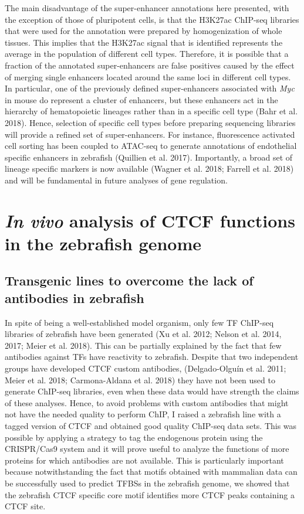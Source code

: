 The main disadvantage of the super-enhancer annotations here presented, with the exception of those of pluripotent cells, is that the H3K27ac ChIP-seq libraries that were used for the annotation were prepared by homogenization of whole tissues. This implies that the H3K27ac signal that is identified represents the average in the population of different cell types. Therefore, it is possible that a fraction of the annotated super-enhancers are false positives caused by the effect of merging single enhancers located around the same loci in different cell types. In particular, one of the previously defined super-enhancers associated with \textit{Myc} in mouse do represent a cluster of enhancers, but these enhancers act in the hierarchy of hematopoietic lineages rather than in a specific cell type (Bahr et al. 2018). Hence, selection of specific cell types before preparing sequencing libraries will provide a refined set of super-enhancers. For instance, fluorescence activated cell sorting has been coupled to ATAC-seq to generate annotations of endothelial specific enhancers in zebrafish (Quillien et al. 2017). Importantly, a broad set of lineage specific markers is now available (Wagner et al. 2018; Farrell et al. 2018) and will be fundamental in future analyses of gene regulation.\\

	\section{\textit{In vivo} analysis of CTCF functions in the zebrafish genome}

		\subsection{Transgenic lines to overcome the lack of antibodies in zebrafish}

In spite of being a well-established model organism, only few TF ChIP-seq libraries of zebrafish have been generated (Xu et al. 2012; Nelson et al. 2014, 2017; Meier et al. 2018). This can be partially explained by the fact that few antibodies against TFs have reactivity to zebrafish. Despite that two independent groups have developed CTCF custom antibodies, (Delgado-Olguín et al. 2011; Meier et al. 2018; Carmona-Aldana et al. 2018) they have not been used to generate ChIP-seq libraries, even when these data would have strength the claims of these analyses. Hence, to avoid problems with custom antibodies that might not have the needed quality to perform ChIP, I raised a zebrafish line with a tagged version of CTCF and obtained good quality ChIP-seq data sets. This was possible by applying a strategy to tag the endogenous protein using the CRISPR/Cas9 system and it will prove useful to analyze the functions of more proteins for which antibodies are not available. This is particularly important because notwithstanding the fact that motifs obtained with mammalian data can be successfully used to predict TFBSs in the zebrafish genome, we showed that the zebrafish CTCF specific core motif identifies more CTCF peaks containing a CTCF site.\\


